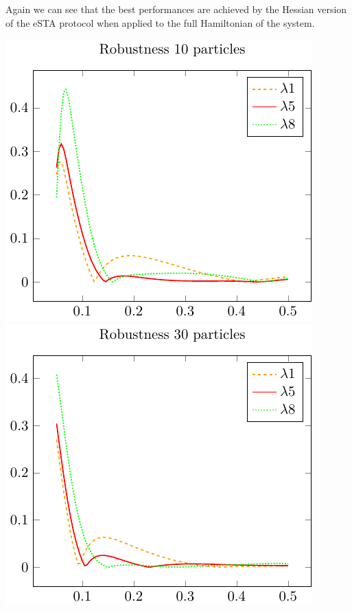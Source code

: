 \documentclass{article}
\begin{document}
Again we can see that the best performances are achieved by the Hessian version of the eSTA protocol when applied to the full Hamiltonian of the system.

\includegraphics{./gfx/robustness_compare10.pdf}
\includegraphics{./gfx/robustness_compare30.pdf}
\end{document}
